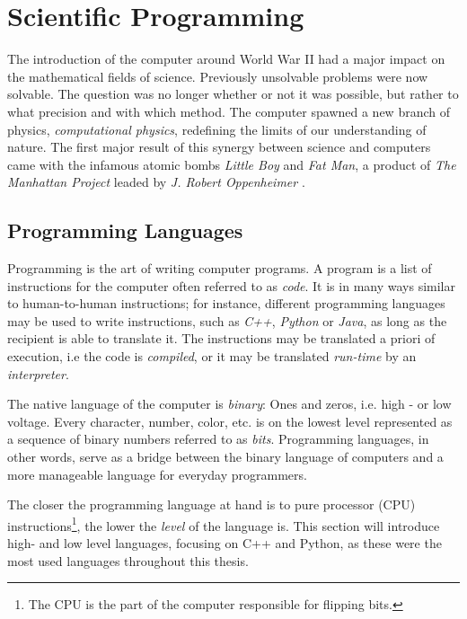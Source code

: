 \chapter{Scientific Programming}
\label{ch:SciProg}

The introduction of the computer around World War II had a major impact on the mathematical fields of science. Previously unsolvable problems were now  solvable. The question was no longer whether or not it was possible, but rather to what precision and with which method. The computer spawned a new branch of physics, \textit{computational physics}, redefining the limits of our understanding of nature. The first major result of this synergy between science and computers came with the infamous atomic bombs \textit{Little Boy} and \textit{Fat Man}, a product of \textit{The Manhattan Project} leaded by \textit{J. Robert Oppenheimer} \cite{supermen}. 

\section{Programming Languages}

Programming is the art of writing computer programs. A program is a list of instructions for the computer often referred to as \textit{code}. It is in many ways similar to human-to-human instructions; for instance, different programming languages may be used to write instructions, such as \textit{C++}, \textit{Python} or \textit{Java}, as long as the recipient is able to translate it. The instructions may be translated a priori of execution, i.e the code is \textit{compiled}, or it may be translated \textit{run-time} by an \textit{interpreter}. 

The native language of the computer is \textit{binary}: Ones and zeros, i.e. high - or low voltage. Every character, number, color, etc. is on the lowest level represented as a sequence of binary numbers referred to as \textit{bits}. Programming languages, in other words, serve as a bridge between the binary language of computers and a more manageable language for everyday programmers.

The closer the programming language at hand is to pure processor (CPU) instructions\footnote{The CPU is the part of the computer responsible for flipping bits.}, the lower the \textit{level} of the language is. This section will introduce high- and low level languages, focusing on C++ and Python, as these were the most used languages throughout this thesis.   


